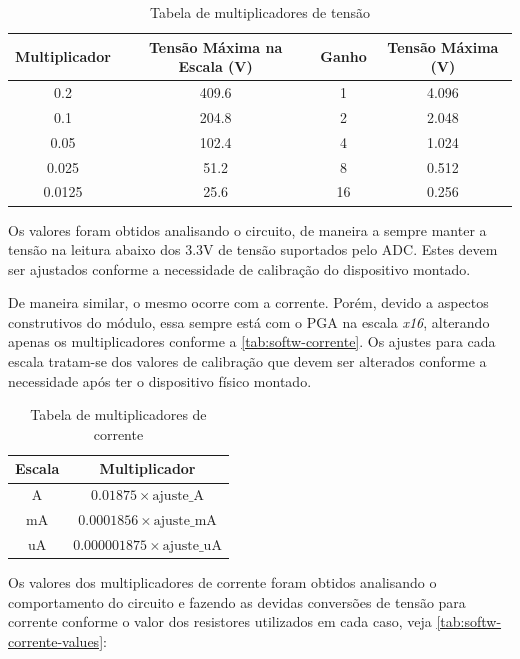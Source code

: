 \begin{table}[h!]
    \centering
    \caption{Tabela de multiplicadores de tensão}
    \begin{tabular}{|c|c|c|c|}
        \hline
        \textbf{Multiplicador} & \textbf{Tensão Máxima na Escala (V)} & \textbf{Ganho} & \textbf{Tensão Máxima (V)} \\
        \hline
        0.2 & 409.6 & 1 & 4.096 \\
        0.1 & 204.8 & 2 & 2.048 \\
        0.05 & 102.4 & 4 & 1.024 \\
        0.025 & 51.2 & 8 & 0.512 \\
        0.0125 & 25.6 & 16 & 0.256 \\
        \hline
    \end{tabular}
    \label{tab:softw-tensao}
\end{table}

Os valores foram obtidos analisando o circuito, de maneira a sempre manter a tensão na leitura abaixo dos 3.3V de tensão suportados pelo \gls{ADC}. Estes devem ser ajustados conforme a necessidade de calibração do dispositivo montado.

De maneira similar, o mesmo ocorre com a corrente. Porém, devido a aspectos construtivos do módulo, essa sempre está com o \gls{PGA} na escala \textit{x16}, alterando apenas os multiplicadores conforme a \autoref{tab:softw-corrente}.
Os ajustes para cada escala tratam-se dos valores de calibração que devem ser alterados conforme a necessidade após ter o dispositivo físico montado.

\begin{table}[h!]
    \centering
    \caption{Tabela de multiplicadores de corrente}
    \begin{tabular}{|c|c|}
        \hline
        \textbf{Escala} & \textbf{Multiplicador} \\
        \hline
        A & $0.01875 \times \text{ajuste\_A}$ \\
        mA & $0.0001856 \times \text{ajuste\_mA}$ \\
        uA & $0.000001875 \times \text{ajuste\_uA}$ \\
        \hline
    \end{tabular}
    \label{tab:softw-corrente}
\end{table}

Os valores dos multiplicadores de corrente foram obtidos analisando o comportamento do circuito e fazendo as devidas conversões de tensão para corrente conforme o valor dos resistores utilizados em cada caso, veja \autoref{tab:softw-corrente-values}:

